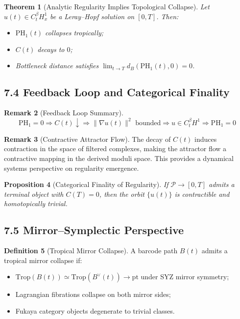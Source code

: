 \documentclass[11pt]{article}
\newtheorem{theorem}{Theorem}[section]
\newtheorem{proposition}[theorem]{Proposition}
\theoremstyle{definition}
\newtheorem{definition}[theorem]{Definition}
\newtheorem{remark}[theorem]{Remark}
\begin{document}
\begin{theorem}[Analytic Regularity Implies Topological Collapse]
Let $u(t) \in C^\beta_t H^1_x$ be a Leray--Hopf solution on $[0, T]$. Then:
\begin{itemize}
  \item $\mathrm{PH}_1(t)$ collapses tropically;
  \item $C(t)$ decays to $0$;
  \item Bottleneck distance satisfies $\lim_{t \to T} d_B(\mathrm{PH}_1(t), 0) = 0$.
\end{itemize}
\end{theorem}

\subsection*{7.4 Feedback Loop and Categorical Finality}

\begin{remark}[Feedback Loop Summary]
\[
\text{PH}_1 = 0 \Longrightarrow C(t)\downarrow \Longrightarrow \|\nabla u(t)\|^2\text{ bounded} \Longrightarrow u \in C_t^\beta H^1 \Longrightarrow \text{PH}_1 = 0
\]
\end{remark}

\begin{remark}[Contractive Attractor Flow]
The decay of $C(t)$ induces contraction in the space of filtered complexes, making the attractor flow a contractive mapping in the derived moduli space. This provides a dynamical systems perspective on regularity emergence.
\end{remark}

\begin{proposition}[Categorical Finality of Regularity]
If $\mathcal{P} \to [0,T]$ admits a terminal object with $C(T) = 0$, then the orbit $\{ u(t) \}$ is contractible and homotopically trivial.
\end{proposition}

\subsection*{7.5 Mirror--Symplectic Perspective}

\begin{definition}[Tropical Mirror Collapse]
A barcode path $B(t)$ admits a tropical mirror collapse if:
\begin{itemize}
  \item $\mathrm{Trop}(B(t)) \simeq \mathrm{Trop}(B^\vee(t)) \to \mathrm{pt}$ under SYZ mirror symmetry;
  \item Lagrangian fibrations collapse on both mirror sides;
  \item Fukaya category objects degenerate to trivial classes.
\end{itemize}
\end{definition}
\end{document}
